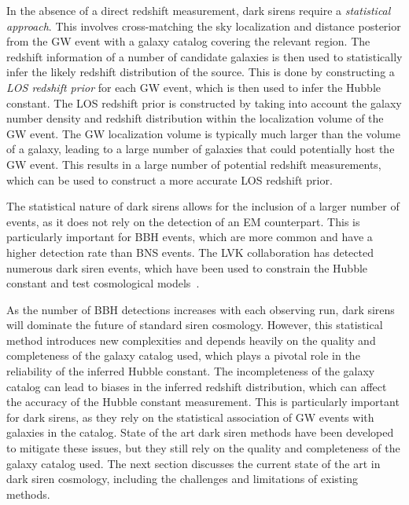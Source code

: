 In the absence of a direct redshift measurement, dark sirens require a \textit{statistical approach}. This involves cross-matching the sky localization and distance posterior from the \ac{GW} event with a galaxy catalog covering the relevant region. The redshift information of a number of candidate galaxies is then used to statistically infer the likely redshift distribution of the source. This is done by constructing a \textit{\acf{LOS} redshift prior} for each \ac{GW} event, which is then used to infer the Hubble constant. The LOS redshift prior is constructed by taking into account the galaxy number density and redshift distribution within the localization volume of the \ac{GW} event. The \ac{GW} localization volume is typically much larger than the volume of a galaxy, leading to a large number of galaxies that could potentially host the \ac{GW} event. This results in a large number of potential redshift measurements, which can be used to construct a more accurate \ac{LOS} redshift prior.

The statistical nature of dark sirens allows for the inclusion of a larger number of events, as it does not rely on the detection of an \ac{EM} counterpart. This is particularly important for \ac{BBH} events, which are more common and have a higher detection rate than \ac{BNS} events. 
The \acf{LVK} collaboration has detected numerous dark siren events, which have been used to constrain the Hubble constant and test cosmological models~\citep{abbott2023constraints}.

As the number of \ac{BBH} detections increases with each observing run, dark sirens will dominate the future of standard siren cosmology. However, this statistical method introduces new complexities and depends heavily on the quality and completeness of the galaxy catalog used, which plays a pivotal role in the reliability of the inferred Hubble constant. The incompleteness of the galaxy catalog can lead to biases in the inferred redshift distribution, which can affect the accuracy of the Hubble constant measurement. This is particularly important for dark sirens, as they rely on the statistical association of \ac{GW} events with galaxies in the catalog. State of the art dark siren methods have been developed to mitigate these issues, but they still rely on the quality and completeness of the galaxy catalog used. The next section discusses the current state of the art in dark siren cosmology, including the challenges and limitations of existing methods.

